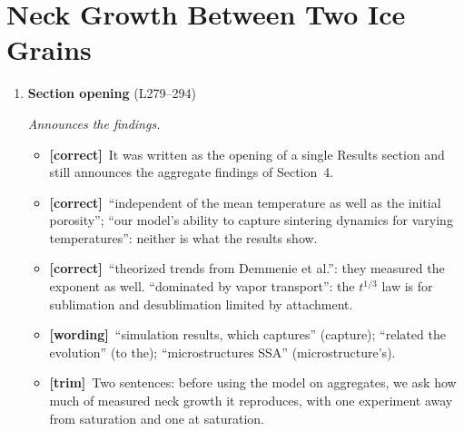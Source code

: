 \documentclass[11pt]{article}
\newcommand{\Pg}[3]{\item \textbf{#1} {\small(#2)}\par\textit{#3}}
\newcommand{\tC}{\textcolor{miss}{\textbf{[correct]}}\ }
\newcommand{\tG}{\textcolor{stale}{\textbf{[wording]}}\ }
\newcommand{\tT}{\textcolor{cut}{\textbf{[trim]}}\ }
\begin{document}
\section{Neck Growth Between Two Ice Grains}
\begin{enumerate}
\Pg{Section opening}{L279--294}{Announces the findings.}
  \begin{itemize}
  \item \tC It was written as the opening of a single Results section and
    still announces the aggregate findings of Section~4.
  \item \tC ``independent of the mean temperature as well as the initial
    porosity''; ``our model's ability to capture sintering dynamics for
    varying temperatures'': neither is what the results show.
  \item \tC ``theorized trends from Demmenie et al.'': they measured the
    exponent as well. ``dominated by vapor transport'': the $t^{1/3}$ law
    is for sublimation and desublimation limited by attachment.
  \item \tG ``simulation results, which captures'' (capture); ``related the
    evolution'' (to the); ``microstructures SSA'' (microstructure's).
  \item \tT Two sentences: before using the model on aggregates, we ask how
    much of measured neck growth it reproduces, with one experiment away
    from saturation and one at saturation.
  \end{itemize}
\end{enumerate}
\end{document}
